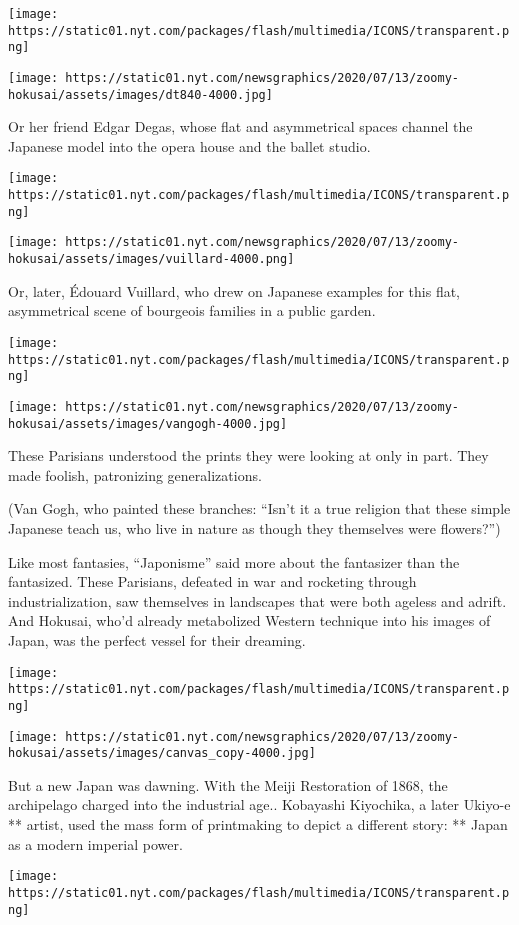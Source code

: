 \texttt{[image: https://static01.nyt.com/packages/flash/multimedia/ICONS/transparent.png]}

\texttt{[image: https://static01.nyt.com/newsgraphics/2020/07/13/zoomy-hokusai/assets/images/dt840-4000.jpg]}

Or her friend Edgar Degas, whose flat and asymmetrical spaces channel
the Japanese model into the opera house and the ballet studio.

\texttt{[image: https://static01.nyt.com/packages/flash/multimedia/ICONS/transparent.png]}

\texttt{[image: https://static01.nyt.com/newsgraphics/2020/07/13/zoomy-hokusai/assets/images/vuillard-4000.png]}

Or, later, Édouard Vuillard, who drew on Japanese examples for this
flat, asymmetrical scene of bourgeois families in a public garden.

\texttt{[image: https://static01.nyt.com/packages/flash/multimedia/ICONS/transparent.png]}

\texttt{[image: https://static01.nyt.com/newsgraphics/2020/07/13/zoomy-hokusai/assets/images/vangogh-4000.jpg]}

These Parisians understood the prints they were looking at only in part.
They made foolish, patronizing generalizations.

(Van Gogh, who painted these branches: ``Isn't it a true religion that
these simple Japanese teach us, who live in nature as though they
themselves were flowers?'')

Like most fantasies, ``Japonisme'' said more about the fantasizer than
the fantasized. These Parisians, defeated in war and rocketing through
industrialization, saw themselves in landscapes that were both ageless
and adrift. And Hokusai, who'd already metabolized Western technique
into his images of Japan, was the perfect vessel for their dreaming.

\texttt{[image: https://static01.nyt.com/packages/flash/multimedia/ICONS/transparent.png]}

\texttt{[image: https://static01.nyt.com/newsgraphics/2020/07/13/zoomy-hokusai/assets/images/canvas\_copy-4000.jpg]}

But a new Japan was dawning. With the Meiji Restoration of 1868, the
archipelago charged into the industrial age.. Kobayashi Kiyochika, a
later Ukiyo-e ** artist, used the mass form of printmaking to depict a
different story: ** Japan as a modern imperial power.

\texttt{[image: https://static01.nyt.com/packages/flash/multimedia/ICONS/transparent.png]}

